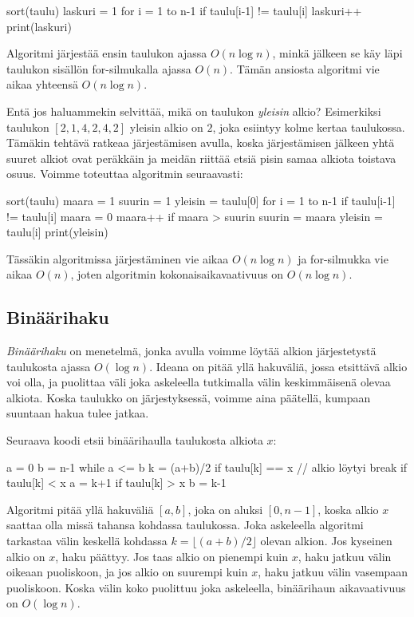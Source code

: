 \begin{code}
sort(taulu)
laskuri = 1
for i = 1 to n-1
    if taulu[i-1] != taulu[i]
        laskuri++
print(laskuri)
\end{code}

Algoritmi järjestää ensin taulukon ajassa $O(n \log n)$,
minkä jälkeen se käy läpi taulukon sisällön for-silmukalla
ajassa $O(n)$.
Tämän ansiosta algoritmi vie aikaa yhteensä $O(n \log n)$.


Entä jos haluammekin selvittää, mikä on taulukon \emph{yleisin} alkio?
Esimerkiksi taulukon $[2,1,4,2,4,2]$ yleisin alkio on $2$,
joka esiintyy kolme kertaa taulukossa.
Tämäkin tehtävä ratkeaa järjestämisen avulla, koska
järjestämisen jälkeen yhtä suuret alkiot ovat peräkkäin ja
meidän riittää etsiä pisin samaa alkiota toistava osuus.
Voimme toteuttaa algoritmin seuraavasti:

\begin{code}
sort(taulu)
maara = 1
suurin = 1
yleisin = taulu[0]
for i = 1 to n-1
    if taulu[i-1] != taulu[i]
        maara = 0
    maara++
    if maara > suurin
        suurin = maara
        yleisin = taulu[i]
print(yleisin)
\end{code}

Tässäkin algoritmissa järjestäminen vie aikaa $O(n \log n)$ ja
for-silmukka vie aikaa $O(n)$, joten algoritmin
kokonaisaikavaativuus on $O(n \log n)$.

\subsection{Binäärihaku}


\emph{Binäärihaku} on menetelmä, jonka avulla voimme löytää alkion
järjestetystä taulukosta ajassa $O(\log n)$.
Ideana on pitää yllä hakuväliä, jossa etsittävä alkio voi olla,
ja puolittaa väli joka askeleella tutkimalla välin
keskimmäisenä olevaa alkiota.
Koska taulukko on järjestyksessä, voimme aina päätellä,
kumpaan suuntaan hakua tulee jatkaa.

Seuraava koodi etsii binäärihaulla taulukosta alkiota $x$:

\begin{code}
a = 0
b = n-1
while a <= b
    k = (a+b)/2
    if taulu[k] == x
        // alkio löytyi
        break
    if taulu[k] < x
        a = k+1
    if taulu[k] > x
        b = k-1
\end{code}

Algoritmi pitää yllä hakuväliä $[a,b]$, joka on aluksi $[0,n-1]$,
koska alkio $x$ saattaa olla missä tahansa kohdassa taulukossa.
Joka askeleella algoritmi tarkastaa välin keskellä kohdassa
$k=\lfloor (a+b)/2 \rfloor$ olevan alkion.
Jos kyseinen alkio on $x$, haku päättyy.
Jos taas alkio on pienempi kuin $x$, haku jatkuu välin
oikeaan puoliskoon,
ja jos alkio on suurempi kuin $x$, haku jatkuu välin
vasempaan puoliskoon.
Koska välin koko puolittuu joka askeleella,
binäärihaun aikavaativuus on $O(\log n)$.

